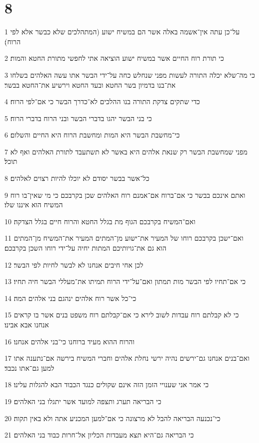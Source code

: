 \chapter{8}

\par 1 על־כן עתה אין־אשמה באלה אשר הם במשיח ישוע (המתהלכים שלא כבשר אלא לפי הרוח)׃
\par 2 כי תורת רוח החיים אשר במשיח ישוע הוציאה אתי לחפשי מתורת החטא והמות׃
\par 3 כי מה־שלא יכלה התורה לעשות מפני שנחלש כחה על־ידי הבשר אתו עשה האלהים בשלחו את־בנו בדמיון בשר החטא ובעד החטא וירשיע את־החטא בבשר׃
\par 4 כדי שתקים צדקת התורה בנו ההלכים לא־כדרך הבשר כי אם־לפי הרוח׃
\par 5 כי בני הבשר יהגו בדברי הבשר ובני הרוח בדברי הרוח׃
\par 6 כי־מחשבת הבשר היא המות ומחשבת הרוח היא החיים והשלום׃
\par 7 מפני שמחשבת הבשר רק שנאת אלהים היא באשר לא תשתעבד לתורת האלהים ואף לא תוכל׃
\par 8 כל־אשר בבשר יסודם לא יוכלו להיות רצוים לאלהים׃
\par 9 ואתם אינכם בבשר כי אם־ברוח אם־אמנם רוח האלהים שכן בקרבכם כי מי שאין־בו רוח המשיח הוא איננו שלו׃
\par 10 ואם־המשיח בקרבכם הגוף מת בגלל החטא והרוח חיים בגלל הצדקה׃
\par 11 ואם־ישכן בקרבכם רוחו של המעיר את־ישוע מן־המתים המעיר את־המשיח מן־המתים הוא גם את־גויותיכם המתות יחיה על־ידי רוחו השכן בקרבכם׃
\par 12 לכן אחי חיבים אנחנו לא לבשר לחיות לפי הבשר׃
\par 13 כי אם־תחיו לפי הבשר מות תמתון ואם־על־ידי הרוח תמיתו את־מעללי הבשר חיה תחיו׃
\par 14 כי־כל אשר רוח אלהים ינהגם בני אלהים המה׃
\par 15 כי לא קבלתם רוח עבדות לשוב לירא כי אם־קבלתם רוח משפט בנים אשר בו קראים אנחנו אבא אבינו׃
\par 16 והרוח ההוא מעיד ברוחנו כי־בני אלהים אנחנו׃
\par 17 ואם־בנים אנחנו גם־ירשים נהיה ירשי נחלת אלהים וחברי המשיח בירשה אם־נתענה אתו למען גם־אתו נכבד׃
\par 18 כי אמר אני שענויי הזמן הזה אינם שקולים כנגד הכבוד הבא להגלות עלינו׃
\par 19 כי הבריאה תערג ותצפה למועד אשר יתגלו בני האלהים׃
\par 20 כי־נכנעה הבריאה להבל לא מרצונה כי אם־למען המכניע אתה ולא באין תקוה׃
\par 21 כי הבריאה גם־היא תצא מעבדות הכליון אל־חרות כבוד בני האלהים׃
